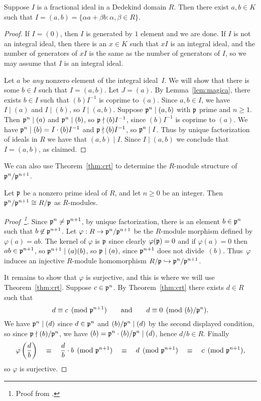 \begin{proposition}\label{prop:2gen}
Suppose $I$ is a fractional ideal in a Dedekind domain $R$.  Then there exist $a,b\in{}K$ such that
$I=(a,b)=\{\alpha a + \beta b : \alpha,\beta \in R\}$.
\end{proposition}
\begin{proof}
If $I=(0)$, then $I$ is generated by $1$ element and we are done.  If
$I$ is not an integral ideal, then there is an $x\in K$ such that $xI$ is
an integral ideal, and the number of generators of $xI$ is the same as
the number of generators of $I$, so we may assume that $I$ is an
integral ideal.

Let $a$ be {\em any} nonzero element of the integral ideal~$I$.  We
will show that there is some $b\in I$ such that $I=(a,b)$.  Let
$J=(a)$.  By Lemma~\ref{lem:magica}, there exists $b\in I$ such that
$(b)I^{-1}$ is coprime to $(a)$.  Since $a,b\in I$, we have $I\mid
(a)$ and $I\mid (b)$, so $I\mid (a,b)$.  Suppose $\mathfrak{p}^n\mid (a,b)$ with
$\mathfrak{p}$ prime and $n\geq 1$.  Then $\mathfrak{p}^n\mid (a)$ and $\mathfrak{p}^n\mid (b)$, so
$\mathfrak{p}\nmid (b)I^{-1}$, since $(b)I^{-1}$ is coprime to $(a)$.  We have
$\mathfrak{p}^n\mid(b) = I\cdot (b)I^{-1}$ and $\mathfrak{p}\nmid (b)I^{-1}$, so $\mathfrak{p}^n
\mid I$.  Thus by unique factorization of ideals in $R$ we
have that $(a,b)\mid I$.  Since $I \mid (a,b)$ we conclude
that  $I=(a,b)$, as claimed.
\end{proof}

We can also use Theorem~\ref{thm:crt} to determine the
$R$-module structure of $\mathfrak{p}^n/\mathfrak{p}^{n+1}$.
\begin{proposition}\label{prop:quopow}
Let $\mathfrak{p}$ be a nonzero prime ideal of $R$, and let $n\geq 0$ be an
integer.  Then $\mathfrak{p}^n/\mathfrak{p}^{n+1} \cong R/\mathfrak{p}$ as $R$-modules.
\end{proposition}
\begin{proof}[Proof~\footnote{Proof from \cite[pg.~13]{sd:brief}.}]
Since $\mathfrak{p}^n\neq \mathfrak{p}^{n+1}$, by unique factorization,
there is an element $b\in
\mathfrak{p}^n$ such that $b\not\in \mathfrak{p}^{n+1}$.  Let
$\varphi:R\to\mathfrak{p}^n/\mathfrak{p}^{n+1}$ be the $R$-module morphism defined by
$\varphi(a)=ab$.  The kernel of $\varphi$ is $\mathfrak{p}$ since clearly
$\varphi(\mathfrak{p})=0$ and if $\varphi(a)=0$ then $ab\in\mathfrak{p}^{n+1}$, so
$\mathfrak{p}^{n+1}\mid (a)(b)$, so $\mathfrak{p} \mid (a)$, since $\mathfrak{p}^{n+1}$ does not
divide~$(b)$.  Thus~$\varphi$ induces an injective $R$-module
homomorphism $R/\mathfrak{p} \hookrightarrow \mathfrak{p}^{n}/\mathfrak{p}^{n+1}$.

It remains to show that $\varphi$ is surjective, and this is where we
will use Theorem~\ref{thm:crt}.   Suppose $c\in \mathfrak{p}^{n}$.
By Theorem~\ref{thm:crt} there exists $d\in R$
such that
$$
  d \equiv c\pmod{\mathfrak{p}^{n+1}}
\qquad\text{and}\qquad
  d \equiv 0\pmod{(b)/\mathfrak{p}^{n}}.
$$
We have $\mathfrak{p}^n\mid (d)$ since $d\in\mathfrak{p}^n$ and $(b)/\mathfrak{p}^n\mid (d)$
by the second displayed condition, so
since $\mathfrak{p}\nmid(b)/\mathfrak{p}^n$, we have $(b)=\mathfrak{p}^n\cdot(b)/\mathfrak{p}^n\mid (d)$, hence
$d/b\in R$.   Finally
\[
 \varphi\left(\frac{d}{b}\right) \quad \equiv \quad \frac{d}{b}\cdot b \pmod{\mathfrak{p}^{n+1}}
 \quad \equiv \quad d\pmod{\mathfrak{p}^{n+1}} \quad\equiv \quad c\pmod{\mathfrak{p}^{n+1}},
\]
so $\varphi$ is surjective.
\end{proof}

